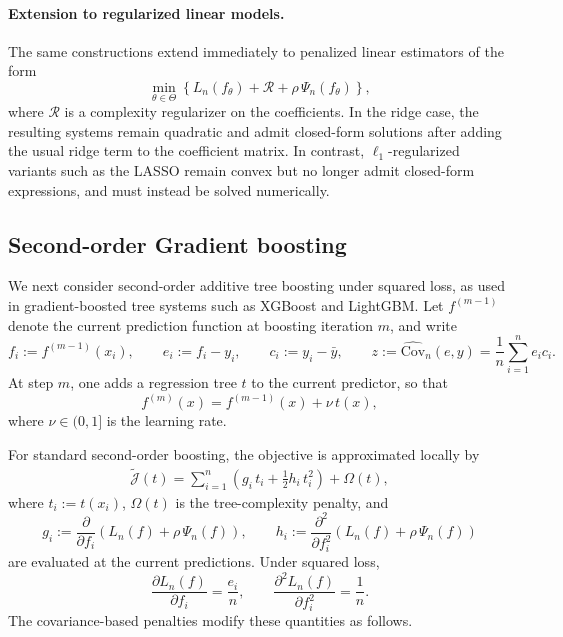 \documentclass[12pt, draft]{article}
\theoremstyle{plain}
\theoremstyle{definition}
\newcommand{\1}{\mathbf{1}}
\newcommand{\Cov}{\text{Cov}}
\begin{document}
\paragraph{Extension to regularized linear models.}
The same constructions extend immediately to penalized linear estimators of the form
\[
\min_{\theta\in\Theta}
\left\{
    L_n(f_\theta) + \mathcal{R} + \rho\,\Psi_n(f_\theta)
\right\},
\]
where \(\mathcal{R}\) is a complexity regularizer on the coefficients. In the ridge case, the resulting systems remain quadratic and admit closed-form solutions after adding the usual ridge term to the coefficient matrix. In contrast, \(\ell_1\)-regularized variants such as the LASSO remain convex but no longer admit closed-form expressions, and must instead be solved numerically.

\subsection{Second-order Gradient boosting}
\label{subsec:tree_boosting}

We next consider second-order additive tree boosting under squared loss, as used in gradient-boosted tree systems such as XGBoost and LightGBM. Let \(f^{(m-1)}\) denote the current prediction function at boosting iteration \(m\), and write
\[
f_i := f^{(m-1)}(x_i),
\qquad
e_i := f_i - y_i,
\qquad
c_i := y_i - \bar y,
\qquad
z := \widehat{\Cov}_n(e,y) = \frac{1}{n}\sum_{i=1}^n e_i c_i.
\]
At step \(m\), one adds a regression tree \(t\) to the current predictor, so that
\[
f^{(m)}(x) = f^{(m-1)}(x) + \nu\,t(x),
\]
where \(\nu\in(0,1]\) is the learning rate.

For standard second-order boosting, the objective is approximated locally by
\begin{align}
    \label{eq:boosting_local_objective}
    \widetilde{\mathcal J}(t)
    =
    \sum_{i=1}^n
    \left(
        g_i\,t_i + \frac{1}{2}h_i\,t_i^2
    \right)
    +
    \Omega(t),
\end{align}
where \(t_i := t(x_i)\), \(\Omega(t)\) is the tree-complexity penalty, and
\[
g_i := \frac{\partial}{\partial f_i}
\left(
L_n(f) + \rho\,\Psi_n(f)
\right),
\qquad
h_i := \frac{\partial^2}{\partial f_i^2}
\left(
L_n(f) + \rho\,\Psi_n(f)
\right)
\]
are evaluated at the current predictions. Under squared loss,
\[
\frac{\partial L_n(f)}{\partial f_i} = \frac{e_i}{n},
\qquad
\frac{\partial^2 L_n(f)}{\partial f_i^2} = \frac{1}{n}.
\]
The covariance-based penalties modify these quantities as follows.
\end{document}
